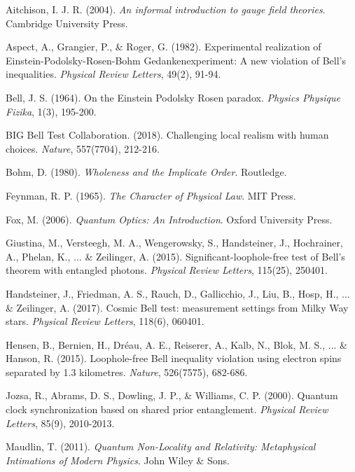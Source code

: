 \documentclass[a4paper,12pt]{article}
\begin{document}
	
	\begin{thebibliography}{99}
		
		 Aitchison, I. J. R. (2004). \textit{An informal introduction to gauge field theories}. Cambridge University Press.
		
		 Aspect, A., Grangier, P., \& Roger, G. (1982). Experimental realization of Einstein-Podolsky-Rosen-Bohm Gedankenexperiment: A new violation of Bell's inequalities. \textit{Physical Review Letters}, 49(2), 91-94.
		
		 Bell, J. S. (1964). On the Einstein Podolsky Rosen paradox. \textit{Physics Physique Fizika}, 1(3), 195-200.
		
		 BIG Bell Test Collaboration. (2018). Challenging local realism with human choices. \textit{Nature}, 557(7704), 212-216.
		
		 Bohm, D. (1980). \textit{Wholeness and the Implicate Order}. Routledge.
		
		 Feynman, R. P. (1965). \textit{The Character of Physical Law}. MIT Press.
		
		 Fox, M. (2006). \textit{Quantum Optics: An Introduction}. Oxford University Press.
		
		 Giustina, M., Versteegh, M. A., Wengerowsky, S., Handsteiner, J., Hochrainer, A., Phelan, K., ... \& Zeilinger, A. (2015). Significant-loophole-free test of Bell's theorem with entangled photons. \textit{Physical Review Letters}, 115(25), 250401.
		
		 Handsteiner, J., Friedman, A. S., Rauch, D., Gallicchio, J., Liu, B., Hosp, H., ... \& Zeilinger, A. (2017). Cosmic Bell test: measurement settings from Milky Way stars. \textit{Physical Review Letters}, 118(6), 060401.
		
		 Hensen, B., Bernien, H., Dréau, A. E., Reiserer, A., Kalb, N., Blok, M. S., ... \& Hanson, R. (2015). Loophole-free Bell inequality violation using electron spins separated by 1.3 kilometres. \textit{Nature}, 526(7575), 682-686.
		
		 Jozsa, R., Abrams, D. S., Dowling, J. P., \& Williams, C. P. (2000). Quantum clock synchronization based on shared prior entanglement. \textit{Physical Review Letters}, 85(9), 2010-2013.
		
		 Maudlin, T. (2011). \textit{Quantum Non-Locality and Relativity: Metaphysical Intimations of Modern Physics}. John Wiley \& Sons.
		

\end{thebibliography}
\end{document}
